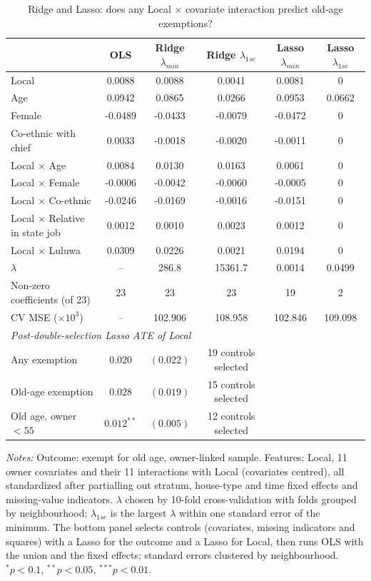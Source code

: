 \begin{table}[!htbp]\centering\footnotesize
\caption{Ridge and Lasso: does any Local $\times$ covariate interaction predict old-age exemptions?}\label{tab:reg}
\begin{threeparttable}
\begin{tabular}{lccccc}
\toprule
 & OLS & Ridge $\lambda_{min}$ & Ridge $\lambda_{1se}$ & Lasso $\lambda_{min}$ & Lasso $\lambda_{1se}$ \\
\midrule
Local & 0.0088 & 0.0088 & 0.0041 & 0.0081 & 0 \\
Age & 0.0942 & 0.0865 & 0.0266 & 0.0953 & 0.0662 \\
Female & -0.0489 & -0.0433 & -0.0079 & -0.0472 & 0 \\
Co-ethnic with chief & 0.0033 & -0.0018 & -0.0020 & -0.0011 & 0 \\
Local $\times$ Age & 0.0084 & 0.0130 & 0.0163 & 0.0061 & 0 \\
Local $\times$ Female & -0.0006 & -0.0042 & -0.0060 & -0.0005 & 0 \\
Local $\times$ Co-ethnic & -0.0246 & -0.0169 & -0.0016 & -0.0151 & 0 \\
Local $\times$ Relative in state job & 0.0012 & 0.0010 & 0.0023 & 0.0012 & 0 \\
Local $\times$ Luluwa & 0.0309 & 0.0226 & 0.0021 & 0.0194 & 0 \\
\midrule
$\lambda$ & -- & 286.8 & 15361.7 & 0.0014 & 0.0499 \\
Non-zero coefficients (of 23) & 23 & 23 & 23 & 19 & 2 \\
CV MSE ($\times 10^3$) & -- & 102.906 & 108.958 & 102.846 & 109.098 \\
\midrule
\multicolumn{6}{l}{\textit{Post-double-selection Lasso ATE of Local}} \\
\hspace{1em}Any exemption & $0.020$ & $(0.022)$ & 19 controls selected &  &  \\
\hspace{1em}Old-age exemption & $0.028$ & $(0.019)$ & 15 controls selected &  &  \\
\hspace{1em}Old age, owner $<55$ & $0.012^{**}$ & $(0.005)$ & 12 controls selected &  &  \\
\bottomrule
\end{tabular}
\begin{tablenotes}[flushleft]\scriptsize
\item \textit{Notes:} Outcome: exempt for old age, owner-linked sample. Features: Local, 11 owner covariates and their 11 interactions with Local (covariates centred), all standardized after partialling out stratum, house-type and time fixed effects and missing-value indicators. $\lambda$ chosen by 10-fold cross-validation with folds grouped by neighbourhood; $\lambda_{1se}$ is the largest $\lambda$ within one standard error of the minimum. The bottom panel selects controls (covariates, missing indicators and squares) with a Lasso for the outcome and a Lasso for Local, then runs OLS with the union and the fixed effects; standard errors clustered by neighbourhood. $^{*}p<0.1$, $^{**}p<0.05$, $^{***}p<0.01$.

\end{tablenotes}
\end{threeparttable}
\end{table}
